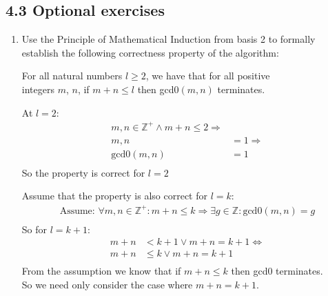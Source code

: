 \documentclass[10pt,\jkfside,a4paper]{article}
\begin{document}
\begin{enumerate}
\begin{enumerate}
\begin{enumerate}[label = (\roman*)]
\end{enumerate}

\end{enumerate}

\end{enumerate}

\subsection*{4.3 Optional exercises}

\begin{enumerate}

\item Use the Principle of Mathematical Induction from basis 2 to formally establish the following 
correctness property of the algorithm:
\begin{center}
For all natural numbers $l \geq 2$, we have that for all positive\\
integers $m$, $n$, if $m + n \leq l$ then gcd0$(m, n)$ terminates.
\end{center}

At $l = 2$:
\begin{equation}
\begin{split}
m, n \in \mathbb{Z}^+ \wedge m + n \leq 2 \Longrightarrow\\
m, n &= 1 \Longrightarrow\\
\text{gcd0}(m, n) &= 1\\
\end{split}
\end{equation}
So the property is correct for $l = 2$

Assume that the property is also correct for $l = k$:
\begin{equation}
\begin{split}
\text{Assume: }\forall m, n \in \mathbb{Z}^+: m + n \leq k \Longrightarrow
\exists g \in \mathbb{Z}: \text{gcd0}(m, n) = g\\
\end{split}
\end{equation}
So for $l = k + 1$:
\begin{equation}
\begin{split}
m + n &< k + 1 \vee m + n = k + 1\Longleftrightarrow\\
m + n &\leq k \vee m + n = k + 1\\
\end{split}
\end{equation}
From the assumption we know that if $m + n \leq k$ then gcd0 terminates.\\
So we need only consider the case where $m + n = k + 1$.


\end{enumerate}
\end{document}

